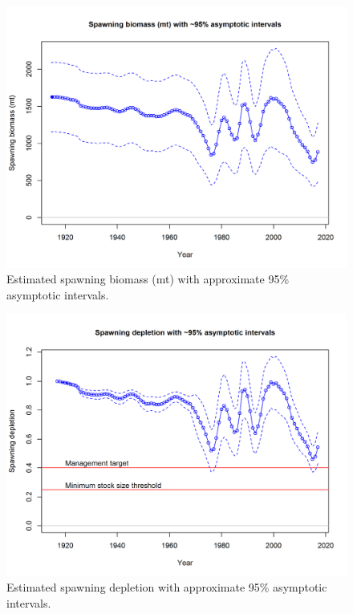 \documentclass[12pt,]{article}
\begin{document}
\begin{figure}[htbp]
\centering
\includegraphics{r4ss/plots_mod1/ts7_Spawning_biomass_(mt)_with_95_asymptotic_intervals_intervals.png}
\caption{Estimated spawning biomass (mt) with approximate 95\%
asymptotic intervals.
\label{fig:ts7_Spawning_biomass_(mt)_with_95_asymptotic_intervals_intervals}}
\end{figure}

\begin{figure}[htbp]
\centering
\includegraphics{r4ss/plots_mod1/ts9_Spawning_depletion_with_95_asymptotic_intervals_intervals.png}
\caption{Estimated spawning depletion with approximate 95\% asymptotic
intervals.
\label{fig:ts9_Spawning_depletion_with_95_asymptotic_intervals_intervals}}
\end{figure}
\end{document}
